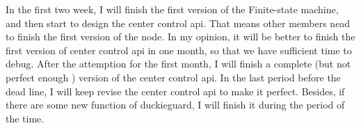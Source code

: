 \documentclass[letterpaper, 10 pt, conference]{ieeeconf}  %
\begin{document}
In the first two week, I will finish the first version of the Finite-state machine, and then start to design the center control api. That means other members nead to finish the first version of the node. In my opinion, it will be better to finish the first version of center control api in one month, so that we have sufficient time to debug. After the attemption for the first month, I will finish a complete (but not perfect enough ) version of the center control api. In the last period before the dead line, I will keep revise the center control api to make it perfect. Besides, if there are some new function of duckieguard, I will finish it during the period of the time. 
   

\addtolength{\textheight}{-12cm}   %



\end{document}
